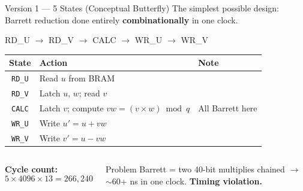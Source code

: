\documentclass[aspectratio=169, 11pt]{beamer}
\begin{document}
\begin{frame}{Version 1 --- 5 States (Conceptual Butterfly)}
The simplest possible design: Barrett reduction done entirely \textbf{combinationally} in one clock.

\vspace{0.3em}
\begin{center}
\ttfamily\small
RD\_U $\to$ RD\_V $\to$ CALC $\to$ WR\_U $\to$ WR\_V
\end{center}

\vspace{0.3em}
\begin{center}
\small
\begin{tabular}{cll}
\toprule
\textbf{State} & \textbf{Action} & \textbf{Note} \\
\midrule
\texttt{RD\_U} & Read $u$ from BRAM & \\
\texttt{RD\_V} & Latch $u$, $w$; read $v$ & \\
\texttt{CALC}  & Latch $v$; compute $vw = (v \times w) \bmod q$ & All Barrett here \\
\texttt{WR\_U} & Write $u' = u + vw$ & \\
\texttt{WR\_V} & Write $v' = u - vw$ & \\
\bottomrule
\end{tabular}
\end{center}

\vspace{0.3em}
\begin{columns}
\textbf{Cycle count:}
\[5 \times 4096 \times 13 = 266{,}240\]

\begin{alertblock}{Problem}
Barrett = two 40-bit multiplies chained $\to$ $\sim$60+ ns in one clock. \textbf{Timing violation.}
\end{alertblock}
\end{columns}
\end{frame}
\end{document}
